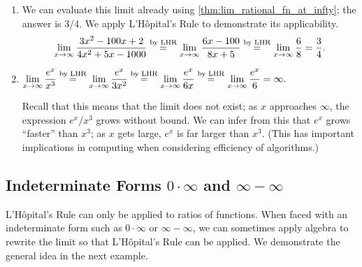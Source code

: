 \begin{example}
\begin{enumerate}
	\item	We can evaluate this limit already using \autoref{thm:lim_rational_fn_at_infty}; the answer is 3/4. We apply L'Hôpital's Rule to demonstrate its applicability.
\[
 \lim_{x\to\infty} \frac{3x^2-100x+2}{4x^2+5x-1000}
 \mathrel{\overset{\text{by LHR}}{=}} \lim_{x\to\infty} \frac{6x-100}{8x+5}
 \mathrel{\overset{\text{by LHR}}{=}} \lim_{x\to\infty} \frac68 = \frac34.
\]

	\item	$\displaystyle\lim_{x\to \infty}\frac{e^x}{x^3} \mathrel{\overset{\text{by LHR}}{=}} \lim_{x\to\infty} \frac{e^x}{3x^2} \mathrel{\overset{\text{by LHR}}{=}} \lim_{x\to\infty} \frac{e^x}{6x} \mathrel{\overset{\text{by LHR}}{=}} \lim_{x\to\infty} \frac{e^x}{6} = \infty.$

Recall that this means that the limit does not exist; as $x$ approaches $\infty$, the expression $e^x/x^3$ grows without bound. We can infer from this that $e^x$ grows ``faster'' than $x^3$; as $x$ gets large, $e^x$ is far larger than $x^3$. (This has important implications in computing when considering efficiency of algorithms.)
\end{enumerate}
\end{example}

\subsection{Indeterminate Forms \texorpdfstring{$0\cdot\infty$ and $\infty-\infty$}{0·∞ and ∞-∞}}

L'Hôpital's Rule can only be applied to ratios of functions. When faced with an indeterminate form such as $0\cdot\infty$ or $\infty-\infty$, we can sometimes apply algebra to rewrite the limit so that L'Hôpital's Rule can be applied. We demonstrate the general idea in the next example.


